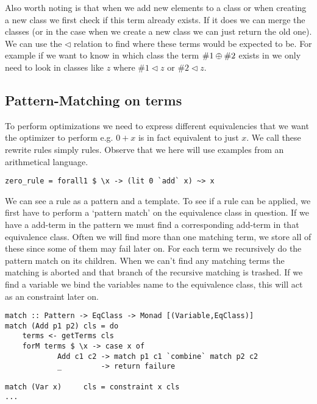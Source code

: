 Also worth noting is that when we add new elements to a class or when creating
a new class we first check if this term already exists. If it does we can merge
the classes (or in the case when we create a new class we can just return the old
one). We can use the $\lhd$ relation to find where these terms would be expected
to be. %
For example if we want to know in which class the term $\#1 \oplus \#2$ exists in we only need to
look in classes like $z$ where $\#1 \lhd z$ or $\#2 \lhd z$.
\subsection{Pattern-Matching on terms}
To perform optimizations we need to express different equivalencies that we want the optimizer to perform e.g. $0 + x$ is in fact equivalent to just $x$. We call these rewrite rules simply rules.
Observe that we here will use examples from an arithmetical language.

\begin{verbatim}
zero_rule = forall1 $ \x -> (lit 0 `add` x) ~> x
\end{verbatim}

We can see a rule as a pattern and a template. To see if a rule can be applied, we first have to perform a `pattern match' on the equivalence class in question. If we have a add-term in the pattern we must find a corresponding add-term in that equivalence class. Often we will find more than one matching term, we store all of these since some of them may fail later on. For each term we recursively do the pattern match on its children. When we can't find any matching terms the matching is aborted and that branch of the recursive matching is trashed. If we find a variable we bind the variables name to the equivalence class, this will act as an constraint later on.

\begin{verbatim}
match :: Pattern -> EqClass -> Monad [(Variable,EqClass)]
match (Add p1 p2) cls = do 
    terms <- getTerms cls
    forM terms $ \x -> case x of
            Add c1 c2 -> match p1 c1 `combine` match p2 c2
            _         -> return failure
                                       
match (Var x)     cls = constraint x cls
...
\end{verbatim}

